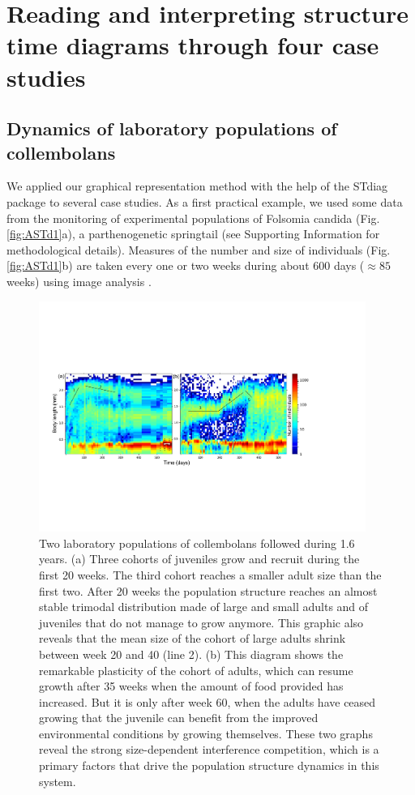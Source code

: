 \section{Reading and interpreting structure time diagrams through four case studies}

\subsection{Dynamics of laboratory populations of collembolans}

We applied our graphical representation method with the help of the STdiag
package to several case studies. As a first practical example, we used some data
from the monitoring of experimental populations of Folsomia candida (Fig.
\ref{fig:ASTd1}a), a parthenogenetic springtail (see Supporting Information for
methodological details). Measures of the number and size of individuals (Fig.
\ref{fig:ASTd1}b) are taken every one or two weeks during about $600$ days
($\approx 85$ weeks) using image analysis \autocites{mallard2013a}.

\begin{figure}[!ht] %
\centering
\includegraphics[width=0.95\textwidth]{2_Methodo/Fig/03}
\caption[Two laboratory populations of collembolans]{
Two laboratory populations of collembolans followed during 1.6 years.
(a) Three cohorts of juveniles grow and recruit during the first 20 weeks. The
third cohort reaches a smaller adult size than the first two. After 20 weeks the
population structure reaches an almost stable trimodal distribution made of
large and small adults and of juveniles that do not manage to grow anymore. This
graphic also reveals that the mean size of the cohort of large adults shrink
between week 20 and 40 (line 2). (b) This diagram shows the remarkable
plasticity of the cohort of adults, which can resume growth after 35 weeks when
the amount of food provided has increased. But it is only after week 60, when
the adults have ceased growing that the juvenile can benefit from the improved
environmental conditions by growing themselves. These two graphs reveal the
strong size-dependent interference competition, which is a primary factors that
drive the population structure dynamics in this system.}
\label{fig:ASTd3}
\end{figure}

